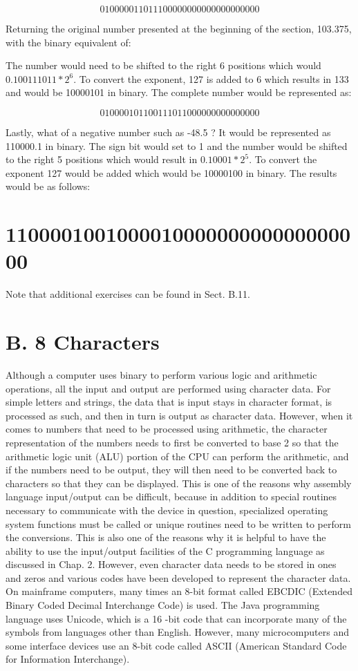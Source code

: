 \documentclass[10pt]{article}
\begin{document}
$$
010000011011100000000000000000000
$$

Returning the original number presented at the beginning of the section, 103.375, with the binary equivalent of:

The number would need to be shifted to the right 6 positions which would $0.100111011 * 2^{6}$. To convert the exponent, 127 is added to 6 which results in 133 and would be 10000101 in binary. The complete number would be represented as:

$$
010000101100111011000000000000000
$$

Lastly, what of a negative number such as -48.5 ? It would be represented as 110000.1 in binary. The sign bit would set to 1 and the number would be shifted to the right 5 positions which would result in $0.10001 * 2^{5}$. To convert the exponent 127 would be added which would be 10000100 in binary. The results would be as follows:

\section*{110000100100001000000000000000000}
Note that additional exercises can be found in Sect. B.11.

\section*{B. 8 Characters}
Although a computer uses binary to perform various logic and arithmetic operations, all the input and output are performed using character data. For simple letters and strings, the data that is input stays in character format, is processed as such, and then in turn is output as character data. However, when it comes to numbers that need to be processed using arithmetic, the character representation of the numbers needs to first be converted to base 2 so that the arithmetic logic unit (ALU) portion of the CPU can perform the arithmetic, and if the numbers need to be output, they will then need to be converted back to characters so that they can be displayed. This is one of the reasons why assembly language input/output can be difficult, because in addition to special routines necessary to communicate with the device in question, specialized operating system functions must be called or unique routines need to be written to perform the conversions. This is also one of the reasons why it is helpful to have the ability to use the input/output facilities of the C programming language as discussed in Chap. 2. However, even character data needs to be stored in ones and zeros and various codes have been developed to represent the character data. On mainframe computers, many times an 8-bit format called EBCDIC (Extended Binary Coded Decimal Interchange Code) is used. The Java programming language uses Unicode, which is a 16 -bit code that can incorporate many of the symbols from languages other than English. However, many microcomputers and some interface devices use an 8-bit code called ASCII (American Standard Code for Information Interchange).
\end{document}
